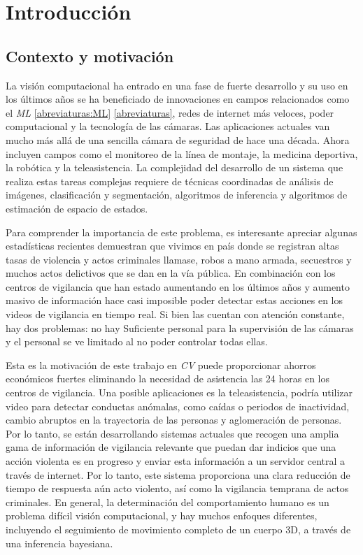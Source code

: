 \chapter{Introducción}


\section{Contexto y motivación}
La visión computacional ha entrado en una fase de fuerte desarrollo  y su uso en los últimos años se ha beneficiado de innovaciones en campos relacionados como el \textit{ML} \ref{abreviaturas:ML} \ref{abreviaturas}, redes de internet más veloces, poder computacional y la tecnología de las cámaras. Las aplicaciones actuales van mucho más allá de una sencilla cámara de seguridad de hace una década. Ahora incluyen campos como el monitoreo de la línea de montaje, la medicina deportiva, la robótica y la teleasistencia. La complejidad del desarrollo de un sistema que realiza estas tareas complejas requiere de técnicas coordinadas de análisis de imágenes, clasificación y segmentación, algoritmos de inferencia y algoritmos de estimación de espacio de estados.
 
 
Para comprender la importancia de este problema, es interesante apreciar algunas estadísticas recientes demuestran que vivimos en país donde se registran altas tasas de violencia y actos criminales llamase, robos a mano armada, secuestros y muchos actos delictivos que se dan en la vía pública. En combinación con los centros de vigilancia que han estado aumentando en los últimos años y aumento masivo de información hace casi imposible poder detectar estas acciones en los videos de vigilancia en tiempo real. Si bien las cuentan con atención constante, hay dos problemas: no hay Suficiente personal para la supervisión de las cámaras y el personal se ve limitado al no poder controlar todas ellas.
 
Esta es la motivación de este trabajo en \textit{CV} puede proporcionar ahorros económicos fuertes eliminando la necesidad de asistencia las 24 horas en los centros de vigilancia. Una posible aplicaciones es la teleasistencia, podría utilizar video para detectar conductas anómalas, como caídas o periodos de inactividad, cambio abruptos en la trayectoria de las personas y aglomeración de personas. Por lo tanto, se están desarrollando sistemas actuales que recogen una amplia gama de información de vigilancia relevante que puedan dar indicios que una acción violenta es en progreso y enviar esta información a un servidor central a través de internet. Por lo tanto, este sistema proporciona una clara reducción de tiempo de respuesta aún acto violento, así como la vigilancia temprana de actos criminales. En general, la determinación del comportamiento humano es un problema difícil visión computacional, y hay muchos enfoques diferentes, incluyendo el seguimiento de movimiento completo de un cuerpo 3D, a través de una inferencia bayesiana.
 
